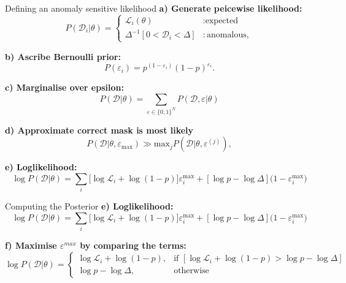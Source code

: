 \documentclass[aspectratio=169]{beamer}
\begin{document}
\begin{frame}{Defining an anomaly sensitive likelihood}
  \footnotesize
  \textbf{a) Generate peicewise likelihood:}
  \begin{equation}
      P(\mathcal{D}_i|\theta) = \begin{cases}
          \mathcal{L}_i(\theta) &: \text{expected}\\
          \Delta^{-1}[ 0<\mathcal{D}_i<\Delta] &: \text{anomalous},
      \end{cases}
  \end{equation}

  \textbf{b) Ascribe Bernoulli prior:}
  \begin{equation}
      P(\varepsilon_i) = p^{(1-\varepsilon_i)}(1-p)^{\varepsilon_i}.
  \end{equation}

  \textbf{c) Marginalise over epsilon:}
  \begin{equation}
      P(\mathcal{D} | \theta) =\sum_{\varepsilon \in \{ 0, 1 \} ^N}P(\mathcal{D},\varepsilon|\theta)
    \end{equation}


    \textbf{d) Approximate correct mask is most likely}
     \begin{equation}
 P(\mathcal{D}|\theta, \varepsilon_{\mathrm{max}}) \gg \mathrm{max}_j P(\mathcal{D}|\theta,\varepsilon^{(j)})\label{eq:nlo},
\end{equation}

  \textbf{e) Loglikelihood:}
  \begin{equation}
      \log{P(\mathcal{D}|\theta)} = \sum_{i}[{\log{\mathcal{L}_i}+\log({1-p})]\varepsilon^{\mathrm{max}}_i + [\log{p} - \log{\Delta}](1 - \varepsilon^\mathrm{max}_i})
  \end{equation}
\end{frame}

\begin{frame}{Computing the Posterior}
    \footnotesize
    \textbf{e) Loglikelihood:}
  \begin{equation}\tag{6}
      \log{P(\mathcal{D}|\theta)} = \sum_{i}[{\log{\mathcal{L}_i}+\log({1-p})]\varepsilon^{\mathrm{max}}_i + [\log{p} - \log{\Delta}](1 - \varepsilon^\mathrm{max}_i})
  \end{equation}

    \footnotesize
    \textbf{f) Maximise $\varepsilon^{max}$ by comparing the terms:}
    \begin{equation}\tag{7}
    \log P(\mathcal{D}|\theta) =
    \begin{cases}
    \log \mathcal{L}_i + \log(1 - p), & \text{if } [\log \mathcal{L}_i + \log(1 - p) > \log p - \log \Delta] \\
    \log p - \log \Delta, & \text{otherwise}
    \end{cases}
    \end{equation}
\end{frame}
\end{document}
